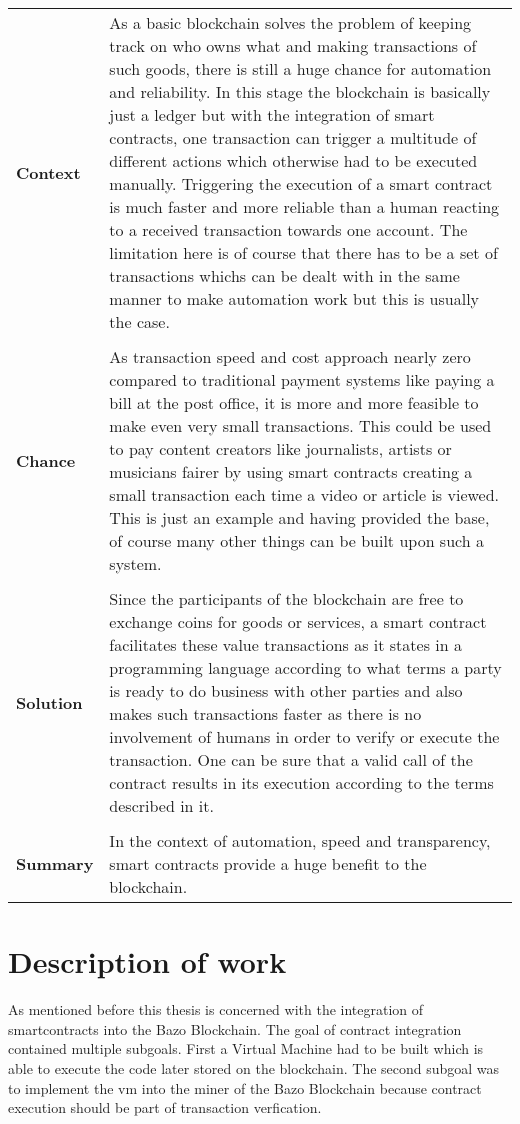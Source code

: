 \begin{tabular}[t]{ p{3cm} p{12.5cm}}
\textbf{Context} & 
As a basic blockchain solves the problem of keeping track on who owns what and making transactions of such goods, there is still a huge chance for automation and reliability. In this stage the blockchain is basically just a ledger but with the integration of smart contracts, one transaction can trigger a multitude of different actions which otherwise had to be executed manually. Triggering the execution of a smart contract is much faster and more reliable than a human reacting to a received transaction towards one account. The limitation here is of course that there has to be a set of transactions whichs can be dealt with in the same manner to make automation work but this is usually the case. \\ \\

\textbf{Chance} & 
As transaction speed and cost approach nearly zero compared to traditional payment systems like paying a bill at the post office, it is more and more feasible to make even very small transactions. This could be used to pay content creators like journalists, artists or musicians fairer by using smart contracts creating a small transaction each time a video or article is viewed. This is just an example and having provided the base, of course many other things can be built upon such a system.\\ \\

\textbf{Solution} & 
Since the participants of the blockchain are free to exchange coins for goods or services, a smart contract facilitates these value transactions as it states in a programming language according to what terms a party is ready to do business with other parties and also makes such transactions faster as there is no involvement of humans in order to verify or execute the transaction. One can be sure that a valid call of the contract results in its execution according to the terms described in it. \\ \\

\textbf{Summary} & 
In the context of automation, speed and transparency, smart contracts provide a huge benefit to the blockchain.

\end{tabular}

\section{Description of work}
\label{descriptionofwork}
As mentioned before this thesis is concerned with the integration of smartcontracts into the Bazo Blockchain. The goal of contract integration contained multiple subgoals. First a Virtual Machine had to be built which is able to execute the code later stored on the blockchain. The second subgoal was to implement the vm into the miner of the Bazo Blockchain because contract execution should be part of transaction verfication.